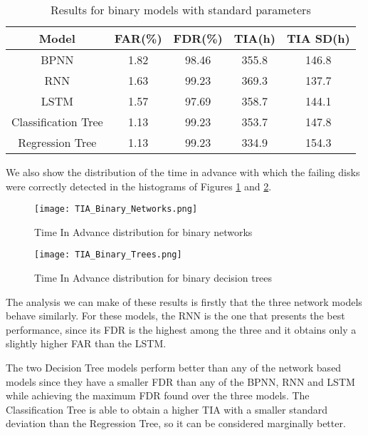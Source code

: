 \begin{table}
  \begin{center}
    \begin{tabular}{|c|c|c|c|c|}
      \hline
    Model & FAR(\%) & FDR(\%) & TIA(h) & TIA SD(h) \\
    \hline
    BPNN & 1.82 & 98.46 & 355.8 & 146.8 \\
    RNN & 1.63 & 99.23 & 369.3 & 137.7 \\
    LSTM & 1.57 & 97.69 & 358.7 & 144.1 \\
    Classification Tree & 1.13 & 99.23 & 353.7 & 147.8 \\
    Regression Tree & 1.13 & 99.23 & 334.9 & 154.3 \\
    \hline
    \end{tabular}
    \caption[Results Binary Models]{Results for binary models with standard parameters}
    \label{table:results_binary}
  \end{center}
\end{table}

We also show the distribution of the time in advance with which the failing disks were correctly detected in the histograms of Figures \ref{fig:tia_binary_network} and \ref{fig:tia_binary_tree}.

\begin{figure}
\begin{center}
  \texttt{[image: TIA\_Binary\_Networks.png]}
  \caption[TIA for binary networks]{Time In Advance distribution for binary networks}
  \label{fig:tia_binary_network}
\end{center}
\end{figure}

\begin{figure}
\begin{center}
  \texttt{[image: TIA\_Binary\_Trees.png]}
  \caption[TIA for binary decision trees]{Time In Advance distribution for binary decision trees}
  \label{fig:tia_binary_tree}
\end{center}
\end{figure}

The analysis we can make of these results is firstly that the three network models behave similarly.
For these models, the RNN is the one that presents the best performance, since its FDR is the highest among the three and it obtains only a slightly higher FAR than the LSTM.

The two Decision Tree models perform better than any of the network based models since they have a smaller FDR than any of the BPNN, RNN and LSTM while achieving the maximum FDR found over the three models.
The Classification Tree is able to obtain a higher TIA with a smaller standard deviation than the Regression Tree, so it can be considered marginally better.

